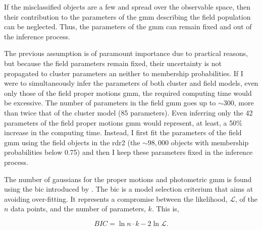 If the misclassified objects are a few and spread over the observable space, then their contribution to the parameters of the \gls{gmm} describing the field population can be neglected. Thus, the parameters of the \gls{gmm} can remain fixed and out of the inference process. 

The previous assumption is of paramount importance due to practical reasons, but because the field parameters remain fixed, their uncertainty is not propagated to cluster parameters an neither to membership probabilities. If I were to simultaneously infer the parameters of both cluster and field models, even only those of the field proper motions \gls{gmm}, the required computing time would be excessive. The number of parameters in the field \gls{gmm} goes up to $\sim 300$, more than twice that of the cluster model (85 parameters). {Even inferring only the 42 parameters of the field proper motions \gls{gmm} would represent, at least, a 50\% increase in the computing time}. Instead, I first fit the parameters of the field \gls{gmm} using the field objects in the \gls{rdr2} (the $\sim 98,000$ objects with membership probabilities below 0.75) and then I keep these parameters fixed in the inference process.   

 

The number of gaussians for the proper motions and photometric \gls{gmm} is found using the \gls{bic} introduced by \citet{Schwarz1978}. The \gls{bic} is a model selection criterium that aims at avoiding over-fitting. It represents a compromise between the likelihood, $\mathcal{L}$, of the $n$ data points, and the number of parameters, $k$. This is,

\begin{equation}
\label{eq:BIC}
BIC = \ln{n}\cdot k - 2 \ln{\mathcal{L}}.
\end{equation}

